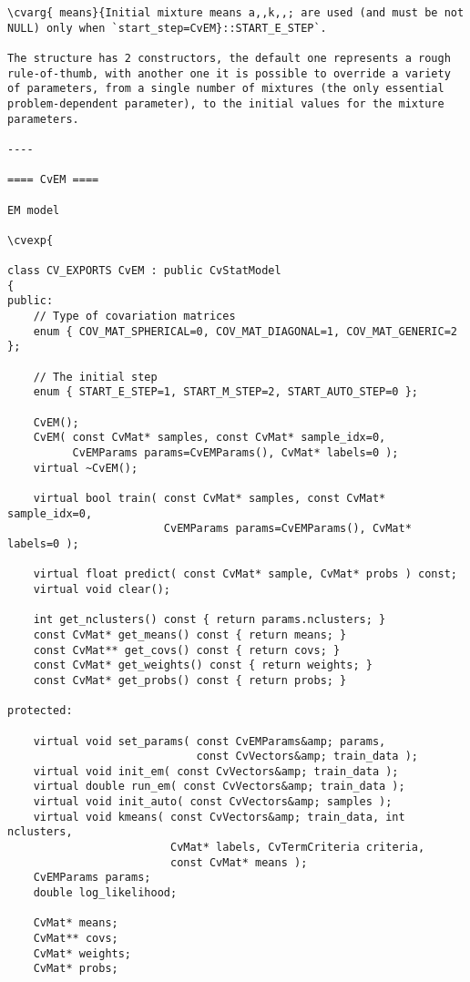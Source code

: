 \begin{verbatim}
\cvarg{ means}{Initial mixture means a,,k,,; are used (and must be not NULL) only when `start_step=CvEM}::START_E_STEP`.

The structure has 2 constructors, the default one represents a rough rule-of-thumb, with another one it is possible to override a variety of parameters, from a single number of mixtures (the only essential problem-dependent parameter), to the initial values for the mixture parameters.

----

==== CvEM ====

EM model

\cvexp{

class CV_EXPORTS CvEM : public CvStatModel
{
public:
    // Type of covariation matrices
    enum { COV_MAT_SPHERICAL=0, COV_MAT_DIAGONAL=1, COV_MAT_GENERIC=2 };

    // The initial step
    enum { START_E_STEP=1, START_M_STEP=2, START_AUTO_STEP=0 };

    CvEM();
    CvEM( const CvMat* samples, const CvMat* sample_idx=0,
          CvEMParams params=CvEMParams(), CvMat* labels=0 );
    virtual ~CvEM();

    virtual bool train( const CvMat* samples, const CvMat* sample_idx=0,
                        CvEMParams params=CvEMParams(), CvMat* labels=0 );

    virtual float predict( const CvMat* sample, CvMat* probs ) const;
    virtual void clear();

    int get_nclusters() const { return params.nclusters; }
    const CvMat* get_means() const { return means; }
    const CvMat** get_covs() const { return covs; }
    const CvMat* get_weights() const { return weights; }
    const CvMat* get_probs() const { return probs; }

protected:

    virtual void set_params( const CvEMParams&amp; params,
                             const CvVectors&amp; train_data );
    virtual void init_em( const CvVectors&amp; train_data );
    virtual double run_em( const CvVectors&amp; train_data );
    virtual void init_auto( const CvVectors&amp; samples );
    virtual void kmeans( const CvVectors&amp; train_data, int nclusters,
                         CvMat* labels, CvTermCriteria criteria,
                         const CvMat* means );
    CvEMParams params;
    double log_likelihood;

    CvMat* means;
    CvMat** covs;
    CvMat* weights;
    CvMat* probs;


\end{verbatim}
